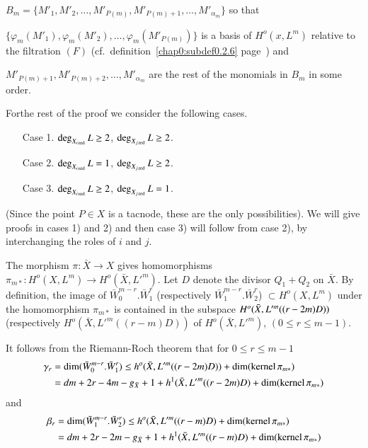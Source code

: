 {\noindent
$B_{m} = \{M'_{1}, M'_{2} , \ldots , M'_{P(m)} , M'_{P(m)+1} , \ldots,
M'_{\alpha_{m}}\} $ so that 

\noindent
$ \{\varphi_{m} (M'_{1}), \varphi_{m} (M'_{2}) , \ldots , \varphi_{m}
(M'_{P (m)})\}$ is a basis of $H^o (x, L^{m})$ relative to the
filtration $(F)$ (cf.\ definition~\ref{chap0:subdef0.2.6} 
page~\pageref{chap0:subdef0.2.6}) and   

\noindent
$M'_{P(m)+1}, M'_{P(m)+2},  \ldots , M'_{\alpha_{m}}$ are the rest of
the monomials in $B_{m}$ in some order.   

For\pageoriginale the rest of the proof we consider the following
cases.  
\begin{enumerate}
\item[{\rm Case 1.}] $\deg_{X_{i \operatorname{red}}} L \ge 2$, $\deg_{X_{j \operatorname{red}}} L \ge 2$.

\item[{\rm Case 2.}] $\deg_{X_{i \operatorname{red}}} L = 1$,  $\deg_{X_{j \operatorname{red}}} L \ge 2$.

\item[{\rm Case 3.}] $\deg_{X_{i \operatorname{red}}} L \ge 2$,  $\deg_{X_{j \operatorname{red}}} L = 1$.
\end{enumerate}

(Since the point $P \in X$ is a tacnode, these are the only
possibilities). We will give proofs in cases 1) and 2) and then
case 3) will follow from case 2), by interchanging the roles of
$i$ and $j$.  

\medskip
{}
The morphism $\pi : \bar{X} \to X$ gives homomorphisms $\pi_{m*}:
H^o (X, L^{m}) \to H^o(\bar{X}, L'^{m})$. Let $D$ denote the
divisor $Q_{1} + Q_{2}$ on $\bar{X}$. By definition, the image of
$\bar{W}^{m-r}_{0} . \bar{W}^{r}_{1}$ (respectively $\bar{W}^{m-r}_{1}
. \bar{W}^{r}_{2}$)  $\subset H^o (X , L^{m})$ under the homomorphism
$\pi_{m*}$ is contained in the subspace  $H^o (\bar{X}, L'^{m}\break
((r-2m) D))$ (respectively $H^o (\bar{X}, L'^{m}((r-m)D))$ of
$H^o(\bar{X}, L'^{m})$, $(0 \le r \le m-1)$.   

It follows from the Riemann-Roch theorem that for $0 \leq r \leq m-1$
\begin{align*}
\gamma_{r} & = \dim ( \bar{W}^{m-r}_{0} . \bar{W}^{r}_{1}) \le h^{o}
(\bar{X}, L'^{m} ((r-2m)D)) + \dim ( \operatorname{kernel}  \pi_{m*}) \\ 
& = dm + 2r - 4m - g_{\bar{X}} + 1 + h^{1} ( \bar{X}, {L'}^{m}
((r-2m)D)+\dim (\operatorname{kernel} \pi_{m*})
\end{align*}
and
\begin{align*}
\beta_{r} & = \dim ( \bar{W}^{m-r}_{1}. \bar{W}^{r}_{2}) \le h^{o}
(\bar{X}, L'^{m} ((r-m)D) + \dim ( \operatorname{kernel}  \pi_{m*}) \\ 
& = dm + 2r - 2m - g_{\bar{X}} + 1 + h^{1} ( \bar{X}, L'^{m}
((r-m)D)+\dim (\operatorname{kernel} \pi_{m*}) 
\end{align*}

}
